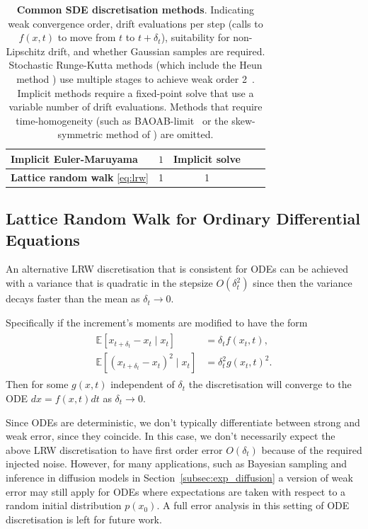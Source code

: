 \documentclass[pra,showpacs,amsmath,amssymb,amsfonts,lengthcheck,longbibliography,onecolumn]{revtex4-2}
\newcommand{\cmark}{{\color{mygreen}\ding{52}}}%
\newcommand{\xmark}{{\color{myred}\ding{56}}}%
\newcommand{\E}{\mathbb{E}}
\begin{document}
\begin{table}[h!]
\begin{tabular}{lcccc}
  Implicit Euler-Maruyama \citep{hu1996semi}
    & $1$ & Implicit solve & \cmark & \xmark \\
  
  
  \hline
  \textbf{Lattice random walk} \eqref{eq:lrw} & 1 & 1 & \cmark & \cmark \\
  \hline
  \end{tabular}
  \caption{\textbf{Common SDE discretisation methods}. Indicating weak convergence order, drift evaluations per step (calls to $f(x,t)$ to move from $t$ to $t+\delta_t$), suitability for non-Lipschitz drift, and whether Gaussian samples are required. Stochastic Runge-Kutta methods (which include the Heun method \cite{kloeden1992stochastic}) use multiple stages to achieve weak order 2~\cite{debrabant2008classification}. Implicit methods require a fixed-point solve that use a variable number of drift evaluations. Methods that require time-homogeneity (such as BAOAB-limit~\cite{leimkuhler2013rational} or the skew-symmetric method of \cite{iguchi2024skew}) are omitted.
  }
  \label{tab:sde-methods}
\end{table}


\subsection{Lattice Random Walk for Ordinary Differential Equations}\label{sec:lrw_odes}
An alternative LRW discretisation that is consistent for ODEs can be achieved with a variance that is quadratic in the stepsize $O(\delta_t^2)$ since then the variance decays 
faster than the mean as $\delta_t \to 0$.

Specifically if the increment's moments are modified to have the form
\begin{align}\label{eq:ternary-moments-ode}
\begin{split}
    \E[x_{t+\delta_t} - x_t \mid x_t] &= \delta_t f(x_t, t), \\
    \E[(x_{t+\delta_t} - x_t)^2 \mid x_t] &= \delta_t^2g(x_t, t)^2.
\end{split}
\end{align}
Then for some $g(x,t)$ independent of $\delta_t$ the discretisation will converge to the ODE $dx = f(x,t) dt$ as $\delta_t \to 0$.

Since ODEs are deterministic, we don't typically differentiate between strong and weak
error, since they coincide. In this case, we don't necessarily expect the above LRW
discretisation to have first order error $O(\delta_t)$ because of the required injected
noise. However, for many applications, such as Bayesian sampling and inference in
diffusion models in Section~\ref{subsec:exp_diffusion} a version of weak error
may still apply for ODEs where expectations are taken with respect to a random
initial distribution $p(x_0)$. A full error analysis in this setting of ODE
discretisation is left for future work.
\end{document}
